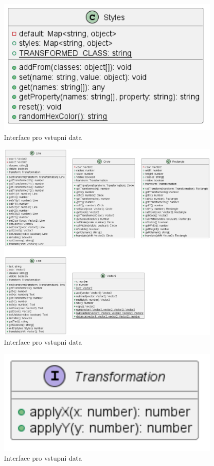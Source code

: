 \begin{figure}[H]
  \centering
  \includegraphics[width=145mm]{../img/styles.png}
  \caption{Interface pro vstupní data}
\end{figure}

\begin{figure}[H]
  \centering
  \includegraphics[width=145mm]{../img/primitives.png}
  \caption{Interface pro vstupní data}
\end{figure}

\begin{figure}[H]
  \centering
  \includegraphics[width=145mm]{../img/iTransformation.png}
  \caption{Interface pro vstupní data}
\end{figure}

